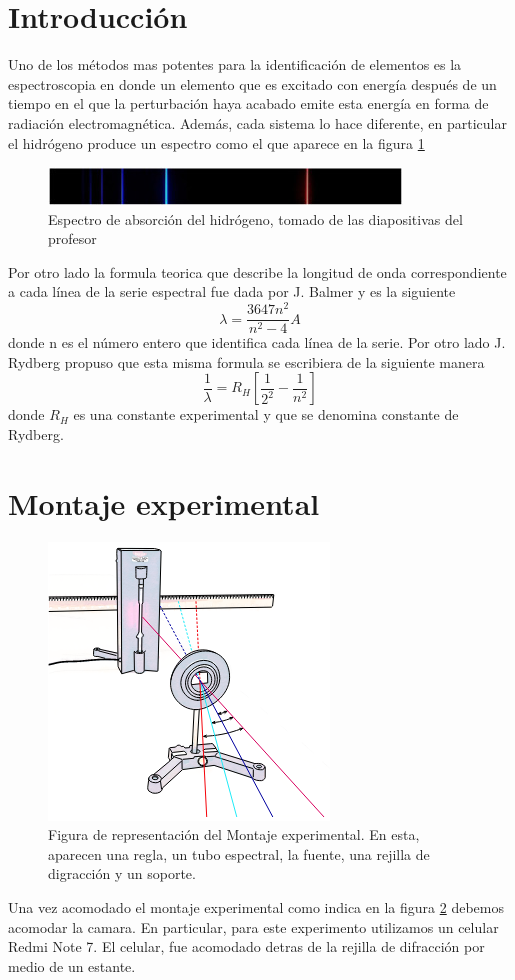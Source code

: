 \documentclass[a4paper, amsfonts, amssymb, amsmath, reprint, showkeys, nofootinbib, twoside]{revtex4-1}
\begin{document}
\section{Introducción}
Uno de los métodos mas potentes para la identificación de elementos es la espectroscopia en donde un elemento que es excitado con energía después de un tiempo en el que la perturbación haya acabado emite esta energía en forma de radiación electromagnética. Además, cada sistema lo hace diferente, en particular el hidrógeno produce un espectro como el que aparece en la figura \ref{fig:Ehidrogeno}
\begin{figure}[H]
    \centering
    \includegraphics[scale=0.6]{Ehidrogeno_Teorico.jpeg}
    \caption{Espectro de absorción del hidrógeno, tomado de las diapositivas del profesor}
    \label{fig:Ehidrogeno}
\end{figure}
Por otro lado la formula teorica que describe la longitud de onda correspondiente a cada línea de la serie espectral fue dada por J. Balmer y es la siguiente
$$\lambda = \frac{3647n^2}{n^2-4}A$$
donde n es el número entero que identifica cada línea de la serie. Por otro lado J. Rydberg propuso que esta misma formula se escribiera de la siguiente manera
$$\frac{1}{\lambda} = R_H\left[ \frac{1}{2^2}-\frac{1}{n^2}\right]$$
donde $R_H$ es una constante experimental y que se denomina constante de Rydberg. \cite{Unal_Moderna}
\section{Montaje experimental}
\begin{figure}[H]
  \centering
  \includegraphics[scale=0.5]{Graficas/procedimiento.png}
  \caption{Figura de representación del Montaje experimental. En esta, aparecen una regla, un tubo espectral, la fuente, una rejilla de digracción y un soporte.}
  \label{fig:procedimiento}
\end{figure}
Una vez acomodado el montaje experimental como indica en la figura \ref{fig:procedimiento} debemos acomodar la camara. En particular, para este experimento utilizamos un celular Redmi Note 7. El celular, fue acomodado detras de la rejilla de difracción por medio de un estante. 
\end{document}
